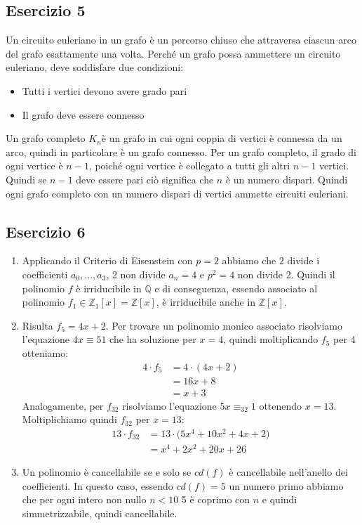 \subsection*{Esercizio 5}
Un circuito euleriano in un grafo è un percorso chiuso che attraversa ciascun arco del grafo esattamente una volta. Perché un grafo possa ammettere un circuito euleriano, deve soddisfare due condizioni:
\begin{itemize}
	\item Tutti i vertici devono avere grado pari
	\item Il grafo deve essere connesso
\end{itemize}
Un grafo completo $K_{n}$​ è un grafo in cui ogni coppia di vertici è connessa da un arco, quindi in particolare è un grafo connesso. Per un grafo completo, il grado di ogni vertice è $n−1$, poiché ogni vertice è collegato a tutti gli altri $n−1$ vertici. Quindi se $n-1$ deve essere pari ciò significa che $n$ è un numero dispari. Quindi ogni grafo completo con un numero dispari di vertici ammette circuiti euleriani.
\subsection*{Esercizio 6}
\begin{enumerate}[label=(\textit{\roman*})]
	\item Applicando il Criterio di Eisenstein con $p=2$ abbiamo che $2$ divide i coefficienti $a_{0},...,a_{3}$, 2 non divide $a_{n}=4$ e $p^{2}=4$ non divide 2. Quindi il polinomio $f$ è irriducibile in $\mathbb{Q}$ e di conseguenza, essendo associato al polinomio $f_{1} \in \mathbb{Z}_{1}[x] = \mathbb{Z}[x]$, è irriducibile anche in $\mathbb{Z}[x]$.
	\item Risulta $f_{5} = 4x+2$. Per trovare un polinomio monico associato risolviamo l'equazione $4x \equiv{5} 1$ che ha soluzione per $x=4$, quindi moltiplicando $f_{5}$ per 4 otteniamo:
	\begin{align*}
		4 \cdot f_{5} &= 4 \cdot (4x+2)   \\
		&= 16x + 8 \\
		&= x + 3
	\end{align*}
Analogamente, per $f_{32}$ risolviamo l'equazione $5x \equiv_{32} 1$ ottenendo $x=13$. Moltiplichiamo quindi $f_{32}$ per $x=\overline{13}$:
\begin{align*}
	13 \cdot f_{32} &= 13 \cdot \bigl(5x^{4} + 10x^{2}+4x+2\bigr) \\
	&= x^{4} +2x^{2} +20x + 26
\end{align*}
\item Un polinomio è cancellabile se e solo se $cd(f)$ è cancellabile nell'anello dei coefficienti. In questo caso, essendo $cd(f)=5$ un numero primo abbiamo che per ogni intero non nullo $n <10$ 5 è coprimo con $n$ e quindi simmetrizzabile, quindi cancellabile.
\end{enumerate}
\vfill
